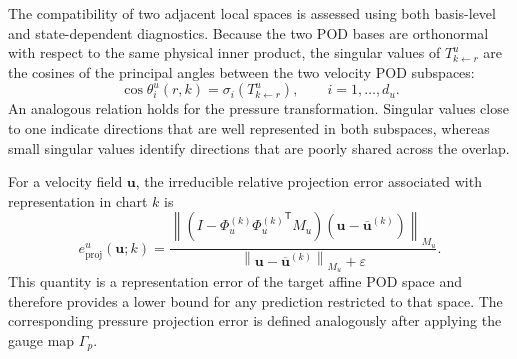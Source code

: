 The compatibility of two adjacent local spaces is assessed using both
basis-level and state-dependent diagnostics.  Because the two POD bases are
orthonormal with respect to the same physical inner product, the singular
values of $T^u_{k\leftarrow r}$ are the cosines of the principal angles
between the two velocity POD subspaces:
\begin{equation}
  \cos\theta_i^u(r,k)
  =
  \sigma_i
  \left(
    T^u_{k\leftarrow r}
  \right),
  \qquad
  i=1,\ldots,d_u.
  \label{eq:velocity_principal_angles}
\end{equation}
An analogous relation holds for the pressure transformation.  Singular
values close to one indicate directions that are well represented in both
subspaces, whereas small singular values identify directions that are
poorly shared across the overlap.

For a velocity field $\boldsymbol{u}$, the irreducible relative projection
error associated with representation in chart $k$ is
\begin{equation}
  e_{\mathrm{proj}}^u(\boldsymbol{u};k)
  =
  \frac{
    \left\|
      \left(
        I
        -\Phi_u^{(k)}
         {\Phi_u^{(k)}}^{\mathsf T}
         M_u
      \right)
      \left(
        \boldsymbol{u}
        -\overline{\boldsymbol{u}}^{(k)}
      \right)
    \right\|_{M_u}
  }{
    \left\|
      \boldsymbol{u}
      -\overline{\boldsymbol{u}}^{(k)}
    \right\|_{M_u}
    +\varepsilon
  }.
  \label{eq:target_projection_floor}
\end{equation}
This quantity is a representation error of the target affine POD space and
therefore provides a lower bound for any prediction restricted to that
space.  The corresponding pressure projection error is defined analogously
after applying the gauge map $\Gamma_p$.


